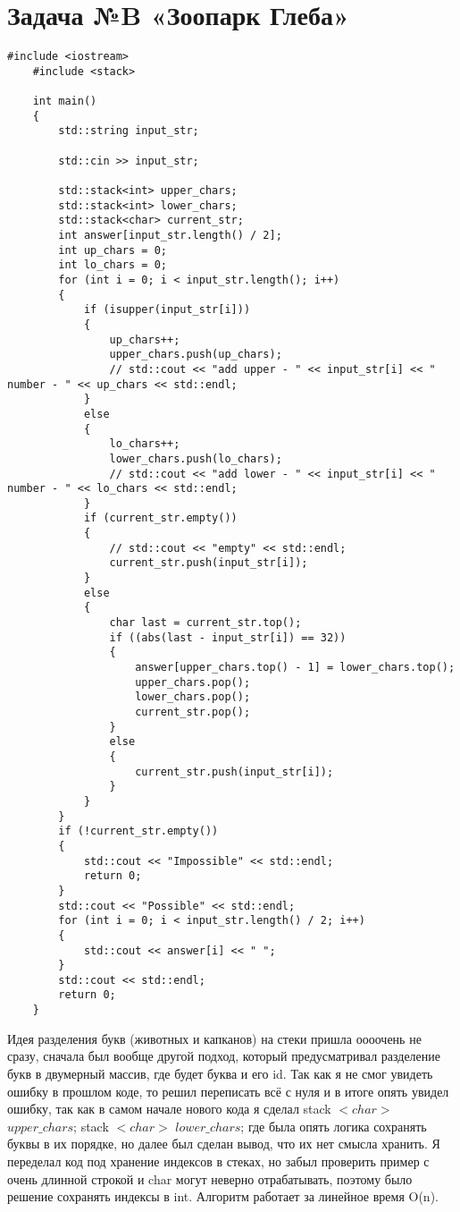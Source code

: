 \documentclass{article}
\begin{document}
\section{Задача №B «Зоопарк Глеба»}
\begin{lstlisting}[frame=single, basicstyle=\ttfamily, breaklines=true, breakatwhitespace=true, postbreak=\mbox{\textcolor{red}{$\hookrightarrow$}\space}]
    #include <iostream>
    #include <stack>
    
    int main()
    {
        std::string input_str;
    
        std::cin >> input_str;
    
        std::stack<int> upper_chars;
        std::stack<int> lower_chars;
        std::stack<char> current_str;
        int answer[input_str.length() / 2];
        int up_chars = 0;
        int lo_chars = 0;
        for (int i = 0; i < input_str.length(); i++)
        {
            if (isupper(input_str[i]))
            {
                up_chars++;
                upper_chars.push(up_chars);
                // std::cout << "add upper - " << input_str[i] << " number - " << up_chars << std::endl;
            }
            else
            {
                lo_chars++;
                lower_chars.push(lo_chars);
                // std::cout << "add lower - " << input_str[i] << " number - " << lo_chars << std::endl;
            }
            if (current_str.empty())
            {
                // std::cout << "empty" << std::endl;
                current_str.push(input_str[i]);
            }
            else
            {
                char last = current_str.top();
                if ((abs(last - input_str[i]) == 32))
                {
                    answer[upper_chars.top() - 1] = lower_chars.top();
                    upper_chars.pop();
                    lower_chars.pop();
                    current_str.pop();
                }
                else
                {
                    current_str.push(input_str[i]);
                }
            }
        }
        if (!current_str.empty())
        {
            std::cout << "Impossible" << std::endl;
            return 0;
        }
        std::cout << "Possible" << std::endl;
        for (int i = 0; i < input_str.length() / 2; i++)
        {
            std::cout << answer[i] << " ";
        }
        std::cout << std::endl;
        return 0;
    }
\end{lstlisting}
Идея разделения букв (животных и капканов) на стеки пришла оооочень не сразу, сначала был вообще другой подход, который предусматривал разделение букв в двумерный массив, где будет буква и его id.
Так как я не смог увидеть ошибку в прошлом коде, то решил переписать всё с нуля и в итоге опять увидел ошибку, так как в самом начале нового кода я сделал stack $< char >$ $upper\_chars$;
stack $< char >$ $lower\_chars$; где была опять логика сохранять буквы в их порядке, но далее был сделан вывод, что их нет смысла хранить. Я переделал код под хранение индексов в стеках, но забыл проверить пример с очень длинной строкой и char могут неверно отрабатывать, поэтому было решение сохранять индексы в int.
Алгоритм работает за линейное время O(n).
\end{document}
